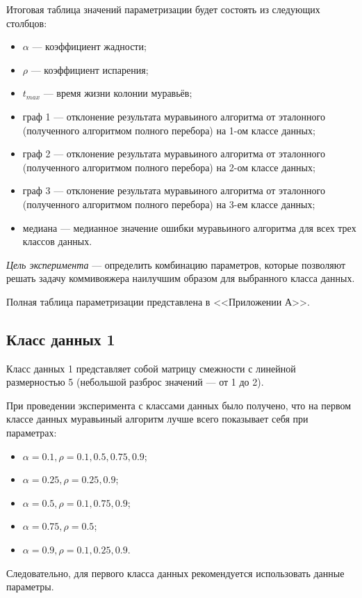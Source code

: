 Итоговая таблица значений параметризации будет состоять из следующих столбцов:
\begin{itemize}[label=---]
	\item $\alpha$ --- коэффициент жадности;
	\item $\rho$ --- коэффициент испарения;
	\item $t_{max}$ --- время жизни колонии муравьёв;
	\item граф 1 --- отклонение результата муравьиного алгоритма от эталонного (полученного алгоритмом полного перебора) на 1-ом классе данных;
        \item граф 2 --- отклонение результата муравьиного алгоритма от эталонного (полученного алгоритмом полного перебора) на 2-ом классе данных;
        \item граф 3 --- отклонение результата муравьиного алгоритма от эталонного (полученного алгоритмом полного перебора) на 3-ем классе данных;
	\item медиана --- медианное значение ошибки муравьиного алгоритма для всех трех классов данных.
\end{itemize}

\textit{Цель эксперимента} --- определить комбинацию параметров, которые позволяют решать задачу коммивояжера наилучшим образом для выбранного класса данных.

Полная таблица параметризации представлена в <<Приложении А>>.

\subsection{Класс данных 1}
\label{par:class1}

Класс данных 1 представляет собой матрицу смежности с линейной размерностью 5 (небольшой разброс значений --- от 1 до 2).

При проведении эксперимента с классами данных было получено, что на первом классе данных муравьиный алгоритм лучше всего показывает себя при параметрах:
\begin{itemize}[label=---]
	\item $\alpha = 0.1,  \rho = 0.1, 0.5, 0.75, 0.9$;
	\item $\alpha = 0.25,  \rho = 0.25, 0.9$;
	\item $\alpha = 0.5,  \rho = 0.1, 0.75, 0.9$;
	\item $\alpha = 0.75,  \rho = 0.5$;
        \item $\alpha = 0.9,  \rho = 0.1, 0.25, 0.9$.
\end{itemize}  
Следовательно, для первого класса данных рекомендуется использовать данные параметры. 

